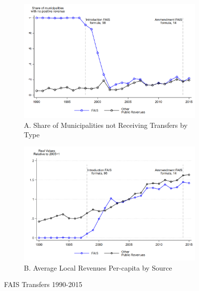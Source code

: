\documentclass[dv_diss_main.tex]{subfiles}
\begin{document}
\begin{figure}[H] 
	\centering 
	
	\begin{subfigure}[t]{0.9\textwidth} 
		\centering
		\includegraphics[width=\linewidth]{figures/Share_FAISnonrecipients_trend.png}
		\caption*{\footnotesize A. Share of Municipalities not Receiving Transfers by Type} 
	\end{subfigure} 
	\vspace{0.1cm}
	\begin{subfigure}[t]{0.9\textwidth} 
		\centering
		\includegraphics[width=\linewidth]{figures/PerCapitaIncome_pertrack.png}
		\caption*{\footnotesize B. Average Local Revenues Per-capita by Source} 
	\end{subfigure}
	\caption{FAIS Transfers 1990-2015}\label{fig:des1A}
	\parbox{\textwidth}{\small 
		\vspace{2eX}
		\scriptsize	
		\figurefaistrends 		
	}
\end{figure}
\end{document}
